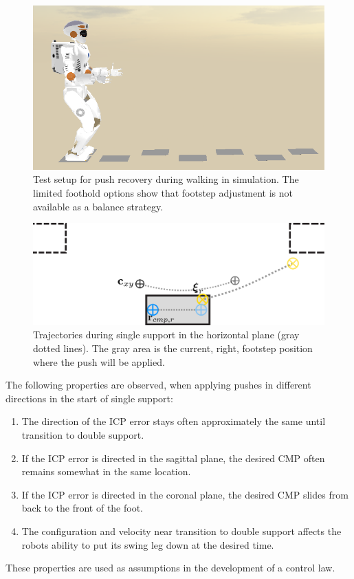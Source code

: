 \begin{figure}[h]
\centering
  \includegraphics[width=.8\linewidth]{STYLESTUFF/valwalkingtest.png}
   \caption{Test setup for push recovery during walking in simulation. The limited foothold options show that footstep adjustment is not available as a balance strategy.}
    \label{fig:valwalkingtest}
\end{figure}
\begin{figure}[h]
\centering
  \includegraphics[width=.8\linewidth]{STYLESTUFF/ICPplan3StepComICPrSS.png}
   \caption{Trajectories during single support in the horizontal plane (gray dotted lines). The gray area is the current, right, footstep position where the push will be applied.}
    \label{fig:3foot}
\end{figure}

The following properties are observed, when applying pushes in different directions in the start of single support:
\begin{enumerate}
	\item The direction of the \ac{ICP} error stays often approximately the same until transition to double support.
	\item If the \ac{ICP} error is directed in the sagittal plane, the desired \ac{CMP} often remains somewhat in the same location.
	\item If the \ac{ICP} error is directed  in the coronal plane, the desired \ac{CMP} slides from back to the front of the foot.
	\item The configuration and velocity near transition to double support affects the robots ability to put its swing leg down at the desired time. 
\end{enumerate}
These properties are used as assumptions in the development of a control law.

